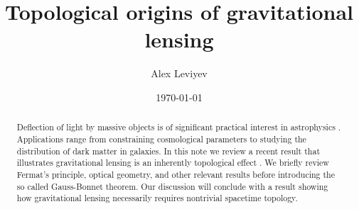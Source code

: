 \documentclass{article}
\theoremstyle{definition}
\theoremstyle{plain}
\theoremstyle{remark}
\begin{document}
\title{Topological origins of gravitational lensing}
\author[1]{Alex Leviyev}
\date{\today}
\maketitle

\begin{abstract}
Deflection of light by massive objects is of significant practical interest in astrophysics \cite{congdon2018principles}. Applications range from constraining cosmological parameters to studying the distribution of dark matter in galaxies. In this note we review a recent result that illustrates gravitational lensing is an inherently topological effect \cite{Gibbons_2008}. We briefly review Fermat's principle, optical geometry, and other relevant results before introducing the so called Gauss-Bonnet theorem. Our discussion will conclude with a result showing how gravitational lensing necessarily requires nontrivial spacetime topology.
\end{abstract}

% 
% 
% 



\end{document}
